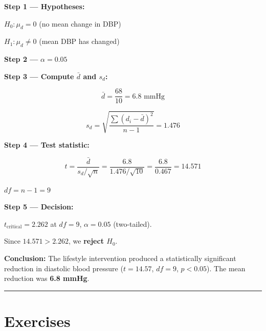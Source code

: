 \documentclass[
  12pt,
  letterpaper,
]{book}
\begin{document}
\begin{tcolorbox}[enhanced jigsaw, arc=.35mm, bottomrule=.15mm, bottomtitle=1mm, breakable, colback=white, colbacktitle=quarto-callout-tip-color!10!white, colframe=quarto-callout-tip-color-frame, coltitle=black, left=2mm, leftrule=.75mm, opacityback=0, opacitybacktitle=0.6, rightrule=.15mm, title={✅ Solution}, titlerule=0mm, toprule=.15mm, toptitle=1mm]

\textbf{Step 1 --- Hypotheses:}

\(H_0: \mu_d = 0\) (no mean change in DBP)

\(H_1: \mu_d \neq 0\) (mean DBP has changed)

\textbf{Step 2 ---} \(\alpha = 0.05\)

\textbf{Step 3 --- Compute \(\bar{d}\) and \(s_d\):}

\[\bar{d} = \frac{68}{10} = 6.8 \text{ mmHg}\]

\[s_d = \sqrt{\frac{\sum(d_i - \bar{d})^2}{n-1}} = 1.476\]

\textbf{Step 4 --- Test statistic:}

\[t = \frac{\bar{d}}{s_d/\sqrt{n}} = \frac{6.8}{1.476/\sqrt{10}}
= \frac{6.8}{0.467} = 14.571\]

\(df = n - 1 = 9\)

\textbf{Step 5 --- Decision:}

\(t_{\text{critical}} = 2.262\) at \(df = 9\), \(\alpha = 0.05\)
(two-tailed).

Since \(14.571 > 2.262\), we \textbf{reject \(H_0\)}.

\textbf{Conclusion:} The lifestyle intervention produced a statistically
significant reduction in diastolic blood pressure (\(t = 14.57\),
\(df = 9\), \(p < 0.05\)). The mean reduction was \textbf{6.8 mmHg}.

\end{tcolorbox}

\begin{center}\rule{0.5\linewidth}{0.5pt}\end{center}


\chapter{Exercises}\label{exercises-4}
\end{document}
